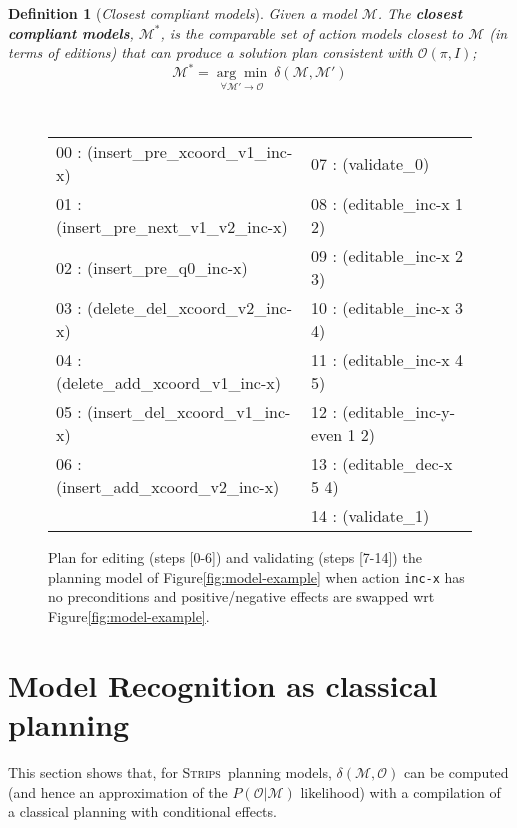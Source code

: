 \documentclass[letterpaper]{article} %
\newcommand{\strips}{\textsc{Strips}}     %
\newtheorem{definition}[theorem]{Definition}
\begin{document}
\begin{definition}[{\em Closest compliant models}] \label{compliant}
Given a model $\mathcal{M}$. The {\bf closest compliant models}, $\mathcal{M^*}$, is the comparable set of action models closest to $\mathcal{M}$ (in terms of editions) that can produce a solution plan consistent with $\mathcal{O}(\pi,I)$;
  \[\mathcal{M^*}=\underset{\forall \mathcal{M}' \rightarrow \mathcal{O}}{\arg\min}\ \delta(\mathcal{M},\mathcal{M}') \]
\end{definition}

\begin{figure}
{\tt\tiny
\begin{tabular}{ll}
00 : (insert\_pre\_xcoord\_v1\_inc-x)   & 07 : (validate\_0)\\
01 : (insert\_pre\_next\_v1\_v2\_inc-x) & 08 : (editable\_inc-x 1 2)\\
02 : (insert\_pre\_q0\_inc-x)           & 09 : (editable\_inc-x 2 3)\\
03 : (delete\_del\_xcoord\_v2\_inc-x)   & 10 : (editable\_inc-x 3 4) \\
04 : (delete\_add\_xcoord\_v1\_inc-x)   & 11 : (editable\_inc-x 4 5)\\
05 : (insert\_del\_xcoord\_v1\_inc-x)   & 12 : (editable\_inc-y-even 1 2)\\
06 : (insert\_add\_xcoord\_v2\_inc-x)   & 13 : (editable\_dec-x 5 4)\\
& 14 : (validate\_1)
\end{tabular}
}
 \caption{\small Plan for editing (steps [0-6]) and validating (steps [7-14]) the planning model of Figure\ref{fig:model-example} when action {\tt\small inc-x} has no preconditions and positive/negative effects are swapped wrt Figure\ref{fig:model-example}.}
\label{fig:plan-pdistance}
\end{figure}



\section{Model Recognition as classical planning}
This section shows that, for \strips\ planning models, $\delta(\mathcal{M},\mathcal{O})$ can be computed (and hence an approximation of the $P(\mathcal{O}|\mathcal{M})$ likelihood) with a compilation of a classical planning with conditional effects.
\end{document}
